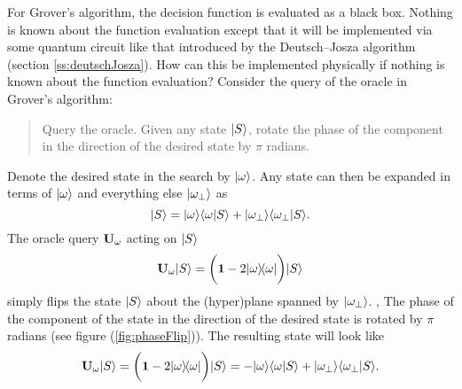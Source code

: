 For Grover's algorithm, the decision function is evaluated as a black box.
Nothing is known about the function evaluation except that it will be
implemented via some quantum circuit like that introduced by the 
Deutsch--Josza algorithm (section \ref{ss:deutschJosza}).
How can this be implemented physically if nothing is known about the 
function evaluation? 
Consider the query of the oracle in Grover's algorithm:
\begin{quote}
Query the oracle.  Given any state ${|{S}\rangle}$, rotate  
the phase of the component in the direction of the desired state
by $\pi$ radians.
\end{quote}
Denote the desired state in the search by ${|{\omega}\rangle}$.
Any state can then be expanded in terms of ${|{\omega}\rangle}$ 
and everything else ${|{\omega_\perp}\rangle}$ as 
\begin{equation}
{|{S}\rangle} = {|{\omega}\rangle}{\langle{\omega}|{S}\rangle} + 
             {|{\omega_\perp}\rangle}{\langle{\omega_\perp}|{S}\rangle}.
\end{equation}
The oracle query ${\bf U_\omega}$ acting on ${|{S}\rangle}$
\begin{equation}
{\bf U_\omega}{|{S}\rangle} = \biggl( {\bf 1} - 2{|{\omega}\rangle\!\langle{\omega}|} \biggr) {|{S}\rangle}
\label{e:oracle}
\end{equation}
simply flips the state ${|{S}\rangle}$ about the (hyper)plane
spanned by ${|{\omega_\perp}\rangle}$.  \ie, The phase of the
component of the state in the direction of the desired
state is rotated by $\pi$ radians (see figure 
(\ref{fig:phaseFlip})).  
The resulting state will look like
\begin{equation}
{\bf U_\omega}{|{S}\rangle} =
\biggl( {\bf 1} - 2{|{\omega}\rangle\!\langle{\omega}|} \biggr) {|{S}\rangle}
= - {|{\omega}\rangle}{\langle{\omega}|{S}\rangle} + 
             {|{\omega_\perp}\rangle}{\langle{\omega_\perp}|{S}\rangle}.
\end{equation}
